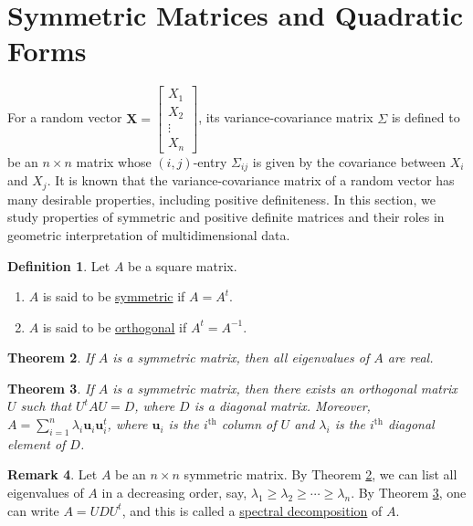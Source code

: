 \documentclass[12pt,letterpaper]{book}
\numberwithin{equation}{section}
\newtheorem{thm}{\textbf{Theorem}}[section]
\theoremstyle{definition}
\newtheorem{defi}[thm]{\textbf{Definition}}
\newtheorem{remark}[thm]{\textbf{Remark}}
\newcommand{\vu}{\bm{u}}
\newcommand{\vX}{\bm{X}}
\begin{document}
\section{Symmetric Matrices and Quadratic Forms}
For a random vector $\vX=\left[\begin{array}{c} X_1 \\ X_2 \\ \vdots \\ X_n \end{array}\right]$, its variance-covariance matrix $\Sigma$ is defined to be an $n\times n$ matrix whose $(i,j)$-entry $\Sigma_{ij}$ is given by the covariance between $X_i$ and $X_j$. It is known that the variance-covariance matrix of a random vector has many desirable properties, including positive definiteness. In this section, we study properties of symmetric and positive definite matrices and their roles in geometric interpretation of multidimensional data.

\begin{defi}\label{symmortho} Let $A$ be a square matrix.
\begin{enumerate}
\item $A$ is said to be \underline{symmetric} if $A=A^t$.
\item $A$ is said to be \underline{orthogonal} if $A^t=A^{-1}$.
\end{enumerate}
\end{defi}

\begin{thm}\label{all real}
If $A$ is a symmetric matrix, then all eigenvalues of $A$ are real.
\end{thm}

\begin{thm}\label{orthogonal diag} If $A$ is a symmetric matrix, then there exists an orthogonal matrix $U$ such that $U^tAU=D$, where $D$ is a diagonal matrix. Moreover, $A=\sum_{i=1}^n \lambda_i \vu_i\vu_i^t$, where $\vu_i$ is the $i^{\text{th}}$ column of $U$ and $\lambda_i$ is the $i^{\text{th}}$ diagonal element of $D$.
\end{thm}

\begin{remark}
Let $A$ be an $n\times n$ symmetric matrix. By Theorem \ref{all real}, we can list all eigenvalues of $A$ in a decreasing order, say, $\lambda_1\geq \lambda_2\geq \cdots \geq \lambda_n$. By Theorem \ref{orthogonal diag}, one can write $A=UDU^t$, and this is called a \underline{spectral decomposition} of $A$.
\end{remark}
\end{document}
